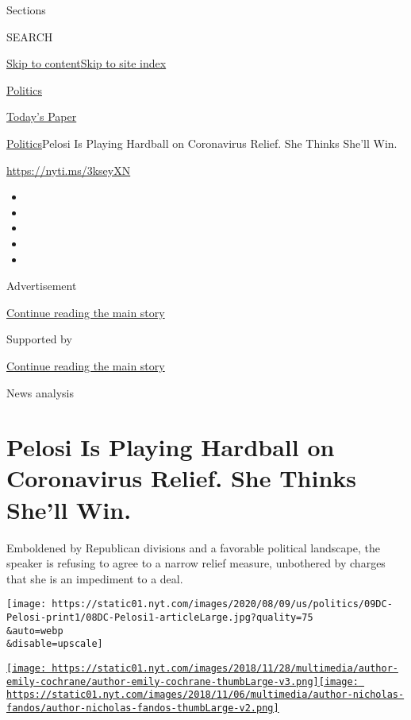 Sections

SEARCH

\protect\hyperlink{site-content}{Skip to
content}\protect\hyperlink{site-index}{Skip to site index}

\href{https://www.nytimes.com/section/politics}{Politics}

\href{https://myaccount.nytimes.com/auth/login?response_type=cookie\&client_id=vi}{}

\href{https://www.nytimes.com/section/todayspaper}{Today's Paper}

\href{/section/politics}{Politics}\textbar{}Pelosi Is Playing Hardball
on Coronavirus Relief. She Thinks She'll Win.

\href{https://nyti.ms/3kseyXN}{https://nyti.ms/3kseyXN}

\begin{itemize}
\item
\item
\item
\item
\item
\end{itemize}

Advertisement

\protect\hyperlink{after-top}{Continue reading the main story}

Supported by

\protect\hyperlink{after-sponsor}{Continue reading the main story}

News analysis

\hypertarget{pelosi-is-playing-hardball-on-coronavirus-relief-she-thinks-shell-win}{%
\section{Pelosi Is Playing Hardball on Coronavirus Relief. She Thinks
She'll
Win.}\label{pelosi-is-playing-hardball-on-coronavirus-relief-she-thinks-shell-win}}

Emboldened by Republican divisions and a favorable political landscape,
the speaker is refusing to agree to a narrow relief measure, unbothered
by charges that she is an impediment to a deal.

\texttt{[image: https://static01.nyt.com/images/2020/08/09/us/politics/09DC-Pelosi-print1/08DC-Pelosi1-articleLarge.jpg?quality=75\\\&auto=webp\\\&disable=upscale]}

\href{https://www.nytimes.com/by/emily-cochrane}{\texttt{[image: https://static01.nyt.com/images/2018/11/28/multimedia/author-emily-cochrane/author-emily-cochrane-thumbLarge-v3.png]}}\href{https://www.nytimes.com/by/nicholas-fandos}{\texttt{[image: https://static01.nyt.com/images/2018/11/06/multimedia/author-nicholas-fandos/author-nicholas-fandos-thumbLarge-v2.png]}}

